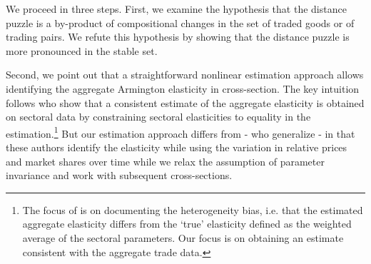 \documentclass[12pt,twoside,a4paper,notitlepage]{article}
\begin{document}
We proceed in three steps.
First, we examine the hypothesis that the distance puzzle is a by-product of compositional changes in the set of traded goods or of trading pairs.
We refute this hypothesis by showing that the distance puzzle is more pronounced in the stable set.

Second, we point out that a straightforward nonlinear estimation approach allows identifying the aggregate Armington elasticity in cross-section. The key intuition follows \cite{Imbs2015} who show that a consistent estimate of the aggregate elasticity is obtained on sectoral data by constraining sectoral elasticities to equality in the estimation.\footnote{The focus of \cite{Imbs2015} is on documenting the heterogeneity bias, i.e. that the estimated aggregate elasticity differs from the `true' elasticity defined as the weighted average of the sectoral parameters. 
Our focus is on obtaining an estimate consistent with the aggregate trade data.} But our estimation approach differs from \cite{Imbs2015} - who generalize \cite{Feenstra1994} - in that these authors identify the elasticity while using the variation in relative prices and market shares over time while we relax the assumption of parameter invariance and work with subsequent cross-sections. 
\end{document}
